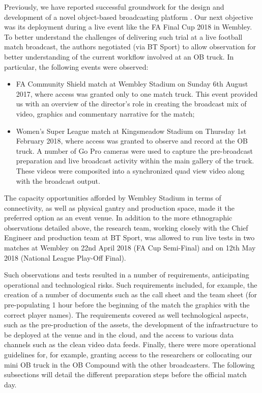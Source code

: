 \documentclass[sigchi-a, authorversion]{acmart}
\begin{document}
Previously, we have reported successful groundwork for the design and development of a novel object-based broadcasting platform \cite{kegel2017, Li:2018_CHI, Li:2018_TVX}. Our next objective was its deployment during a live event like the FA Final Cup 2018 in Wembley. To better understand the challenges of delivering such trial at a live football match broadcast, the authors negotiated (via BT Sport) to allow observation for better understanding of the current workflow involved at an OB truck. In particular, the following events were observed:
\begin{itemize}
  \item FA Community Shield match at Wembley Stadium on Sunday 6th August 2017, where access was granted only to one match truck. This event provided us with an overview of the director's role in creating the broadcast mix of video, graphics and commentary narrative for the match;
  \item Women's Super League match at Kingsmeadow Stadium on Thursday 1st February 2018, where access was granted to observe and record at the OB truck. A number of Go Pro cameras were used to capture the pre-broadcast preparation and live broadcast activity within the main gallery of the truck. These videos were composited into a synchronized quad view video along with the broadcast output.
\end{itemize}

The capacity opportunities afforded by Wembley Stadium in terms of connectivity, as well as physical gantry and production space, made it the preferred option as an event venue. In addition to the more ethnographic observations detailed above, the research team, working closely with the Chief Engineer and production team at BT Sport, was allowed to run live tests in two matches at Wembley on 22nd April 2018 (FA Cup Semi-Final) and on 12th May 2018 (National League Play-Off Final).

Such observations and tests resulted in a number of requirements, anticipating operational and technological risks. Such requirements included, for example, the creation of a number of documents such as the call sheet and the team sheet (for pre-populating 1 hour before the beginning of the match the graphics with the correct player names). The requirements covered as well technological aspects, such as the pre-production of the assets, the development of the infrastructure to be deployed at the venue and in the cloud, and the access to various data channels such as the clean video data feeds. Finally, there were more operational guidelines for, for example, granting access to the researchers or collocating our mini OB truck in the OB Compound with the other broadcasters. The following subsections will detail the different preparation steps before the official match day.
\end{document}
